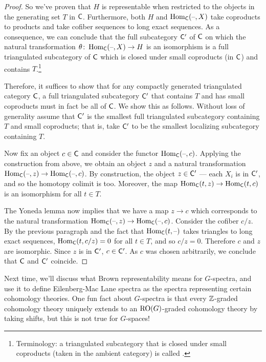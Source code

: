 \begin{proof}
So we've proven that $H$ is representable when restricted to the objects in the generating set $T$ in $\mathsf C$.
Furthermore, both $H$ and $\operatorname{Hom}_\mathsf C(\text{--},X)$ take coproducts to products and take cofiber sequences to long exact
sequences. As a consequence, we can conclude that the full subcategory $\mathsf C'$ of $\mathsf C$ on which the natural
transformation $\theta\colon \operatorname{Hom}_\mathsf C(\text{--},X)\to H$ is an isomorphism is a full triangulated subcategory of $\mathsf C$
which is closed under small coproducts (in $\mathsf C$) and contains $T$.\footnote{Terminology: a triangulated
subcategory that is closed under small coproducts (taken in the ambient category) is called .}

Therefore, it suffices to show that for any compactly generated triangulated category $\mathsf C$, a full triangulated
subcategory $\mathsf C'$ that contains $T$ and has small coproducts must in fact be all of $\mathsf C$. We show this as
follows. Without loss of generality assume that $\mathsf C'$ is the smallest full triangulated subcategory containing $T$
and small coproducts; that is, take $\mathsf C'$ to be the smallest localizing subcategory containing $T$.

Now fix an object $c\in\mathsf C$ and consider the functor $\operatorname{Hom}_\mathsf C(\text{--},c)$. Applying the construction from above, we
obtain an object $z$ and a natural transformation $\operatorname{Hom}_\mathsf C(\text{--},z) \to \operatorname{Hom}_\mathsf C(\text{--},c)$. By construction, the
object $z\in\mathsf C'$ --- each $X_i$ is in $\mathsf C'$, and so the homotopy colimit is too. Moreover, the map
$\operatorname{Hom}_\mathsf C(t,z)\to \operatorname{Hom}_\mathsf C(t,c)$ is an isomorphism for all $t\in T$.

The Yoneda lemma now implies that we have a map $z\to c$ which corresponds to the natural transformation
$\operatorname{Hom}_\mathsf C(\text{--},z) \to \operatorname{Hom}_\mathsf C(\text{--},c)$. Consider the cofiber $c/z$. By the previous paragraph and the fact that
$\operatorname{Hom}_\mathsf C(t,\text{--})$ takes triangles to long exact sequences, $\operatorname{Hom}_\mathsf C(t, c/z) = 0$ for all $t\in T$, and so $c/z =
0$. Therefore $c$ and $z$ are isomorphic. Since $z$ is in $\mathsf C'$, $c\in\mathsf C'$. As $c$ was chosen arbitrarily, we
conclude that $\mathsf C$ and $\mathsf C'$ coincide. 
\end{proof}
Next time, we'll discuss what Brown representability means for $G$-spectra, and use it to define Eilenberg-Mac Lane
spectra as the spectra representing certain cohomology theories. One fun fact about $G$-spectra is that every
$\mathbb Z$-graded cohomology theory uniquely extends to an $\mathrm{RO}(G)$-graded cohomology theory by taking shifts, but this
is not true for $G$-spaces!
